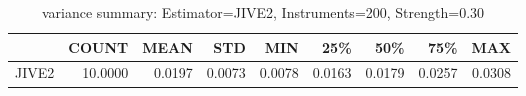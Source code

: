 \begin{table}[ht]
\centering
\caption{variance summary: Estimator=JIVE2, Instruments=200, Strength=0.30}
\begin{tabular}{lrrrrrrrr}
\toprule
 & COUNT & MEAN & STD & MIN & 25\% & 50\% & 75\% & MAX \\
\midrule
JIVE2 & 10.0000 & 0.0197 & 0.0073 & 0.0078 & 0.0163 & 0.0179 & 0.0257 & 0.0308 \\
\bottomrule
\end{tabular}
\end{table}
